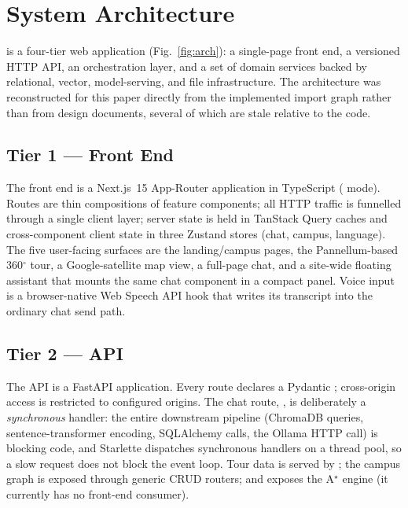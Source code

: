 \section{System Architecture}
\label{sec:architecture}



\system{} is a four-tier web application (Fig.~\ref{fig:arch}): a
single-page front end, a versioned HTTP API, an orchestration layer, and a
set of domain services backed by relational, vector, model-serving, and
file infrastructure. The architecture was reconstructed for this paper
directly from the implemented import graph rather than from design
documents, several of which are stale relative to the code.

\subsection{Tier 1 --- Front End}
The front end is a Next.js~15 App-Router application in TypeScript
( mode). Routes are thin compositions of feature components;
all HTTP traffic is funnelled through a single  client layer;
server state is held in TanStack Query caches and cross-component client
state in three Zustand stores (chat, campus, language). The five
user-facing surfaces are the landing/campus pages, the Pannellum-based
360$^{\circ}$ tour, a Google-satellite map view, a full-page chat, and a
site-wide floating assistant that mounts the same chat component in a
compact panel. Voice input is a browser-native Web Speech API hook that
writes its transcript into the ordinary chat send path.

\subsection{Tier 2 --- API}
The API is a FastAPI application. Every route declares a Pydantic
; cross-origin access is restricted to configured
origins. The chat route, , is deliberately a
\emph{synchronous} handler: the entire downstream pipeline (ChromaDB
queries, sentence-transformer encoding, SQLAlchemy calls, the Ollama HTTP
call) is blocking code, and Starlette dispatches synchronous handlers on a
thread pool, so a slow request does not block the event loop. Tour data is
served by ; the campus graph is exposed through
generic CRUD routers; and  exposes the
A$^{\star}$ engine (it currently has no front-end consumer).

